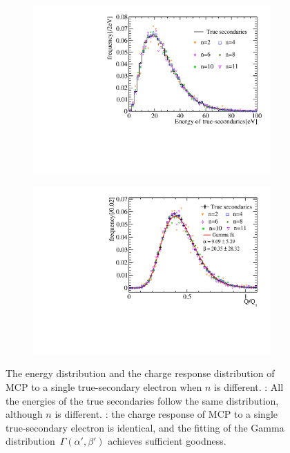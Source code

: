 \begin{figure}[!htbp]
	\centering
	\begin{subfigure}{0.47\textwidth}
		\centering
		\includegraphics[width=\linewidth]{PMTRelated/GTmodel/single_pecharge.pdf}
		\caption{}
		\label{fig:single_pe}
	\end{subfigure}
	\hfill
	\begin{subfigure}{0.47\textwidth}
		\centering
		\includegraphics[width=\linewidth]{PMTRelated/GTmodel/singlepefit.pdf}
		\caption{}
		\label{fig:single_fit}
	\end{subfigure}
	\caption{The energy distribution and the charge response distribution of MCP to a single true-secondary electron when $n$ is different.
		: All the energies of the true secondaries follow the same distribution,
		although $n$ is different.
		: the charge response of MCP to a single true-secondary electron is identical,
		and the fitting of the Gamma distribution~\(\varGamma(\alpha',\beta')\)
		achieves sufficient goodness.}
	\label{fig:singlepe}
\end{figure}

